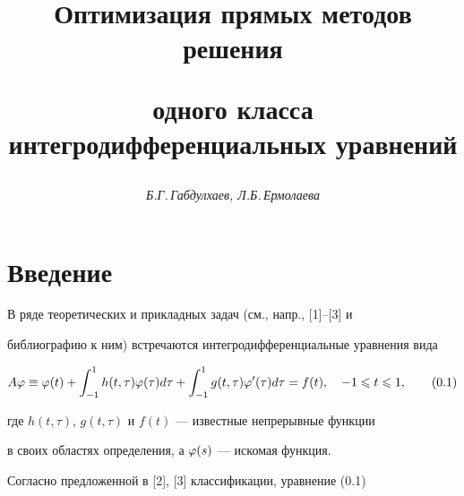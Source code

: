 \author{\it Б.Г.\,Габдулхаев, Л.Б.\,Ермолаева}




\title{Оптимизация прямых методов решения


одного класса интегродифференциальных уравнений}





\date{}




\pagestyle{plain} %







\maketitle


\label{begin}








\section*{Введение}





В ряде теоретических и прикладных задач (см., напр., [1]--[3] и 


библиографию к ним) встречаются интегродифференциальные уравнения вида


\begin{equation}


A\vp \equiv \vp(t) + \int_{-1}^{1} h(t,\tau)\vp(\tau) d\tau +


\int_{-1}^{1}g(t,\tau)\vp'(\tau)d\tau=f(t),\quad -1\lea t\lea 1,


\tag{0.1}


\end{equation}


где $h(t,\tau)$, $g(t,\tau)$ и $f(t)$ --- известные непрерывные функции 


в своих областях определения, а $\varphi(s)$ --- искомая функция.





Согласно предложенной в [2], [3] классификации, уравнение (0.1) 


